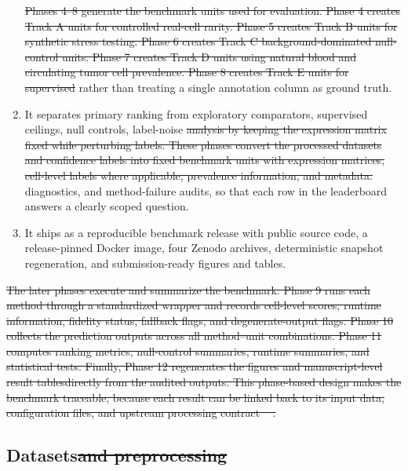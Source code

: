 \documentclass[10pt]{article}
\providecommand{\DIFaddtex}[1]{{\protect\color{trackgreen}#1}} %
\providecommand{\DIFdeltex}[1]{{\protect\color{red}\sout{#1}}}                      %
\providecommand{\DIFaddbegin}{} %
\providecommand{\DIFaddend}{} %
\providecommand{\DIFdelbegin}{} %
\providecommand{\DIFdelend}{} %
\providecommand{\DIFadd}[1]{\texorpdfstring{\DIFaddtex{#1}}{#1}} %
\providecommand{\DIFdel}[1]{\texorpdfstring{\DIFdeltex{#1}}{}} %
\newcommand{\DIFscaledelfig}{0.5}
\newlength{\DIFdelgraphicswidth} %
\newlength{\DIFdelgraphicsheight} %
\newcommand{\DIFaddincludegraphics}[2][]{{\color{trackgreen}\fbox{\DIFOincludegraphics[#1]{#2}}}} %
\newcommand{\DIFdelincludegraphics}[2][]{%
\sbox{\DIFdelgraphicsbox}{\DIFOincludegraphics[#1]{#2}}%
\settoboxwidth{\DIFdelgraphicswidth}{\DIFdelgraphicsbox} %
\settoboxtotalheight{\DIFdelgraphicsheight}{\DIFdelgraphicsbox} %
\scalebox{\DIFscaledelfig}{%
\parbox[b]{\DIFdelgraphicswidth}{\usebox{\DIFdelgraphicsbox}\\[-\baselineskip] \rule{\DIFdelgraphicswidth}{0em}}\llap{\resizebox{\DIFdelgraphicswidth}{\DIFdelgraphicsheight}{%
\setlength{\unitlength}{\DIFdelgraphicswidth}%
\begin{picture}(1,1)%
\thicklines\linethickness{2pt} %
{\color[rgb]{1,0,0}\put(0,0){\framebox(1,1){}}}%
{\color[rgb]{1,0,0}\put(0,0){\line( 1,1){1}}}%
{\color[rgb]{1,0,0}\put(0,1){\line(1,-1){1}}}%
\end{picture}%
}\hspace*{3pt}}} %
} %
\DeclareRobustCommand{\DIFaddbegin}{\DIFOaddbegin \let\includegraphics\DIFaddincludegraphics} %
\DeclareRobustCommand{\DIFaddend}{\DIFOaddend \let\includegraphics\DIFOincludegraphics} %
\DeclareRobustCommand{\DIFdelbegin}{\DIFOdelbegin \let\includegraphics\DIFdelincludegraphics} %
\DeclareRobustCommand{\DIFdelend}{\DIFOaddend \let\includegraphics\DIFOincludegraphics} %
\begin{document}
\begin{enumerate}
\DIFdel{Phases 4--8 generate the benchmark units used for evaluation. Phase 4 creates Track A units for controlled real-cell rarity. Phase 5 creates Track B units for synthetic stress testing. Phase 6 creates Track C background-dominated null-control units. Phase 7 creates Track D units using natural blood and circulating tumor cell prevalence. Phase 8 creates Track E units for supervised }\DIFdelend \DIFaddbegin \DIFadd{rather
  than treating a single annotation column as ground truth.
}\item
  \DIFadd{It separates primary ranking from exploratory comparators, supervised
  ceilings, null controls, }\DIFaddend label-noise \DIFdelbegin \DIFdel{analysis by keeping the expression matrix fixed while perturbing labels. These phases convert the processed datasets and confidence labels into fixed benchmark units with expression matrices, cell-level labels where applicable, prevalence information,
  and metadata.
}\DIFdelend \DIFaddbegin \DIFadd{diagnostics, and method-failure
  audits, so that each row in the leaderboard answers a clearly scoped
  question.
}\item
  \DIFadd{It ships as a reproducible benchmark release with public source code,
  a release-pinned Docker image, four Zenodo archives, deterministic
  snapshot regeneration, and submission-ready figures and tables.
}\end{enumerate}
\DIFaddend 

\DIFdelbegin \DIFdel{The later phases execute and summarize the benchmark. Phase 9 runs each method through a standardized wrapper and records cell-level scores, runtime information, fidelity status, fallback flags, and degenerate-output flags. Phase 10 collects the prediction outputs across all method--unit combinations. Phase 11 computes ranking metrics, null-control summaries, runtime summaries, and statistical tests. Finally, Phase 12 regenerates the figures and manuscript-level result tablesdirectly from the audited outputs. This phase-based design makes the benchmark traceable, because each result can be linked back to its input data, configuration files, and upstream processing contract \mbox{%
\cite{cao2021benchmark}}\hskip0pt%
.
}\DIFdelend \DIFaddbegin \begin{center}\DIFadd{\rule{0.5\linewidth}{0.5pt}}\end{center}
\DIFaddend 

\subsection{Datasets\DIFdelbegin \DIFdel{and preprocessing}\DIFdelend }\DIFaddbegin \label{datasets}
\DIFaddend 
\end{document}

